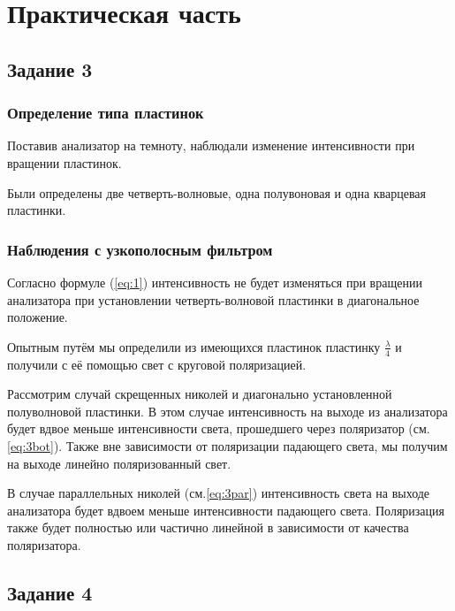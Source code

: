 \section{Практическая часть}
\subsection{Задание 3}
\subsubsection{Определение типа пластинок}
Поставив анализатор на темноту, наблюдали изменение интенсивности при вращении пластинок.

Были определены две четверть-волновые, одна полувоновая и одна кварцевая пластинки. 

\subsubsection{Наблюдения с узкополосным фильтром}
Согласно формуле (\ref{eq:1}) интенсивность не будет изменяться при вращении анализатора при установлении четверть-волновой пластинки в диагональное положение. 

Опытным путём мы определили из имеющихся пластинок пластинку $\frac{\lambda}{4}$ и получили с её помощью свет с круговой поляризацией.

Рассмотрим случай скрещенных николей и диагонально установленной полуволновой пластинки. В этом случае интенсивность на выходе из анализатора будет вдвое меньше интенсивности света, прошедшего через поляризатор (см.\ref{eq:3bot}). Также вне зависимости от поляризации падающего света, мы получим на выходе линейно поляризованный свет.

В случае параллельных николей (см.\ref{eq:3par}) интенсивность света на выходе анализатора будет вдвоем меньше интенсивности падающего света. Поляризация также будет полностью или частично линейной в зависимости от качества поляризатора. 
\subsection{Задание 4}

